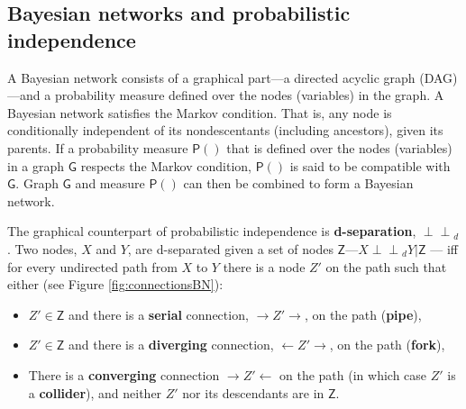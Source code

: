 \documentclass[
  10pt,
  dvipsnames,enabledeprecatedfontcommands]{scrartcl}
\newcommand{\indep}{\!\perp \!\!\! \perp\!}
\newcommand{\pr}[1]{\ensuremath{\mathsf{P}(#1)}}
\begin{document}
\hypertarget{bayesian-networks-and-probabilistic-independence}{%
\subsection*{Bayesian networks and probabilistic
independence}\label{bayesian-networks-and-probabilistic-independence}}

A Bayesian network consists of a graphical part---a directed acyclic
graph (DAG)---and a probability measure defined over the nodes
(variables) in the graph. A Bayesian network satisfies the Markov
condition. That is, any node is conditionally independent of its
nondescentants (including ancestors), given its parents. If a
probability measure \(\pr{}\) that is defined over the nodes (variables)
in a graph \(\mathsf{G}\) respects the Markov condition, \(\pr{}\) is
said to be compatible with \(\mathsf{G}\). Graph \(\mathsf{G}\) and
measure \(\pr{}\) can then be combined to form a Bayesian network.

The graphical counterpart of probabilistic independence is
\textbf{d-separation}, \(\indep_d\). Two nodes, \(X\) and \(Y\), are
d-separated given a set of nodes
\(\mathsf{Z}\)---\(X\indep_d Y \vert \mathsf{Z}\) --- iff for every
undirected path from \(X\) to \(Y\) there is a node \(Z'\) on the path
such that either (see Figure \ref{fig:connectionsBN}):

\begin{itemize}

\item $Z' \in \mathsf{Z}$ and there is a \textbf{serial} connection, $\rightarrow Z' \rightarrow$, on the path (\textbf{pipe}),
\item  $Z'\in \mathsf{Z}$ and there is a \textbf{diverging} connection, $\leftarrow Z' \rightarrow $, on the path (\textbf{fork}),
\item There is a \textbf{converging} connection $\rightarrow Z' \leftarrow$ on the path (in which case $Z'$ is a \textbf{collider}), and neither $Z'$ nor its descendants are in $\mathsf{Z}$.
\end{itemize}

\vspace{1mm}
\end{document}

